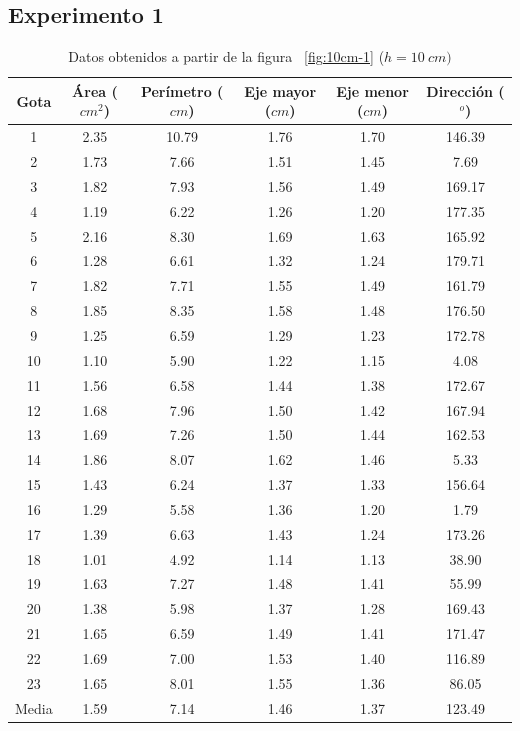 \subsection{Experimento 1} \label{sub:experimento_1}

\begin{table}[H] \centering \caption{Datos obtenidos a partir de la figura
    ~\ref{fig:10cm-1} ($h=10\ cm)$} \label{tab:10cm} \begin{tabular}{cccccc}
        \toprule Gota & Área ($cm^2$) & Perímetro ($cm$) & Eje mayor ($cm$) &
        Eje menor ($cm$) & Dirección ($^o$) \\ \midrule 1     & 2.35 & 10.79 &
        1.76 & 1.70 & 146.39 \\ 2     & 1.73 & 7.66  & 1.51 & 1.45 & 7.69   \\
        3     & 1.82 & 7.93  & 1.56 & 1.49 & 169.17 \\ 4     & 1.19 & 6.22  &
        1.26 & 1.20 & 177.35 \\ 5     & 2.16 & 8.30  & 1.69 & 1.63 & 165.92 \\
        6     & 1.28 & 6.61  & 1.32 & 1.24 & 179.71 \\ 7     & 1.82 & 7.71  &
        1.55 & 1.49 & 161.79 \\ 8     & 1.85 & 8.35  & 1.58 & 1.48 & 176.50 \\
        9     & 1.25 & 6.59  & 1.29 & 1.23 & 172.78 \\ 10    & 1.10 & 5.90  &
        1.22 & 1.15 & 4.08   \\ 11    & 1.56 & 6.58  & 1.44 & 1.38 & 172.67 \\
        12    & 1.68 & 7.96  & 1.50 & 1.42 & 167.94 \\ 13    & 1.69 & 7.26  &
        1.50 & 1.44 & 162.53 \\ 14    & 1.86 & 8.07  & 1.62 & 1.46 & 5.33   \\
        15    & 1.43 & 6.24  & 1.37 & 1.33 & 156.64 \\ 16    & 1.29 & 5.58  &
        1.36 & 1.20 & 1.79   \\ 17    & 1.39 & 6.63  & 1.43 & 1.24 & 173.26 \\
        18    & 1.01 & 4.92  & 1.14 & 1.13 & 38.90  \\ 19    & 1.63 & 7.27  &
        1.48 & 1.41 & 55.99  \\ 20    & 1.38 & 5.98  & 1.37 & 1.28 & 169.43 \\
        21    & 1.65 & 6.59  & 1.49 & 1.41 & 171.47 \\ 22    & 1.69 & 7.00  &
        1.53 & 1.40 & 116.89 \\ 23    & 1.65 & 8.01  & 1.55 & 1.36 & 86.05  \\
    \midrule Media & 1.59 & 7.14  & 1.46 & 1.37 & 123.49 \\ \bottomrule
\end{tabular} \end{table}

